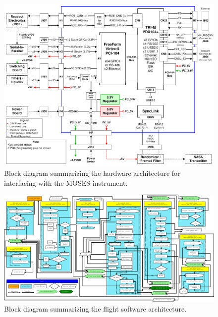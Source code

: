 \documentclass[11pt,titlepage]{article}
\begin{document}


\begin{landscape}
\begin{figure}[h!]
\centering
\includegraphics[width=22.5cm]{images/hw_block}
\caption{Block diagram summarizing the hardware architecture for interfacing with the MOSES instrument.}
\end{figure}
\end{landscape}


\begin{landscape}
\begin{figure}[h!]
\centering
\includegraphics[width=24.5cm]{images/mfsw_block}
\caption{Block diagram summarizing the flight software architecture.}
\end{figure}
\end{landscape}










\end{document}
